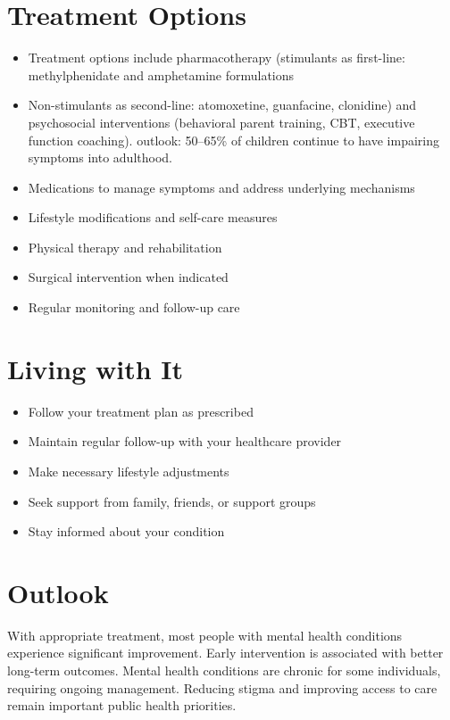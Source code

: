\section{Treatment Options}
\begin{itemize}[noitemsep]
  \item Treatment options include pharmacotherapy (stimulants as first-line: methylphenidate and amphetamine formulations
  \item Non-stimulants as second-line: atomoxetine, guanfacine, clonidine) and psychosocial interventions (behavioral parent training, CBT, executive function coaching). outlook: 50--65\% of children continue to have impairing symptoms into adulthood.
  \item Medications to manage symptoms and address underlying mechanisms
  \item Lifestyle modifications and self-care measures
  \item Physical therapy and rehabilitation
  \item Surgical intervention when indicated
  \item Regular monitoring and follow-up care
\end{itemize}
\section{Living with It}
\begin{itemize}[noitemsep]
  \item Follow your treatment plan as prescribed
  \item Maintain regular follow-up with your healthcare provider
  \item Make necessary lifestyle adjustments
  \item Seek support from family, friends, or support groups
  \item Stay informed about your condition
\end{itemize}
\section{Outlook}
With appropriate treatment, most people with mental health conditions experience significant improvement. Early intervention is associated with better long-term outcomes. Mental health conditions are chronic for some individuals, requiring ongoing management. Reducing stigma and improving access to care remain important public health priorities.
